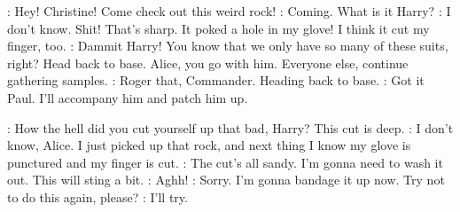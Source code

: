 \documentclass[main.tex]{subfiles}
\begin{document}
	\begin{drama}
		
		
		
		
		
		
	
		\jonesspeaks:		Hey!  Christine!  Come check out this weird rock!
		\morrisonspeaks:	Coming.  What is it Harry?
		\jonesspeaks:		I don't know.  Shit!  That's sharp.  It poked a hole in my glove! I think it cut my finger,
		too.
		\ramseyspeaks:		Dammit Harry!  You know that we only have so many of these suits, right?  Head back to base.
		Alice, you go with him.  Everyone else, continue gathering samples.
		\jonesspeaks:		Roger that, Commander.  Heading back to base.
		\lewisspeaks:		Got it Paul.  I'll accompany him and patch him up.
		
		
		\lewisspeaks:		How the hell did you cut yourself up that bad, Harry?  This cut is deep.  
		\jonesspeaks:		I don't know, Alice.  I just picked up that rock, and next thing I know my glove is punctured
		and my finger is cut.  
		\lewisspeaks:		The cut's all sandy.  I'm gonna need to wash it out.  This will sting a bit.  
		\jonesspeaks:		Aghh!
		\lewisspeaks:		Sorry.  I'm gonna bandage it up now.  Try not to do this again, please?
		\jonesspeaks:		I'll try.   
		
	\end{drama}
		
\end{document}
